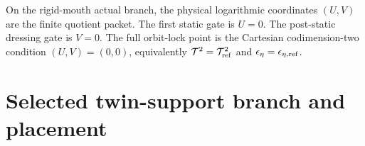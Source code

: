 \begin{theorem}
\label{thm:app-part07-cartesian-orbit-lock}
On the rigid-mouth actual branch, the physical logarithmic coordinates \((U,V)\) are the finite quotient packet.  The first static gate is \(U=0\).  The post-static dressing gate is \(V=0\).  The full orbit-lock point is the Cartesian codimension-two condition \((U,V)=(0,0)\), equivalently \(\mathcal T^2=\mathcal T_{\rm ref}^2\) and \(\epsilon_\eta=\epsilon_{\eta,\rm ref}\).
\end{theorem}


\section{Selected twin-support branch and placement}
\label{sec:app-part07_same_charge_rigid_mouth:selected-twin-support-branch-and-placement}


